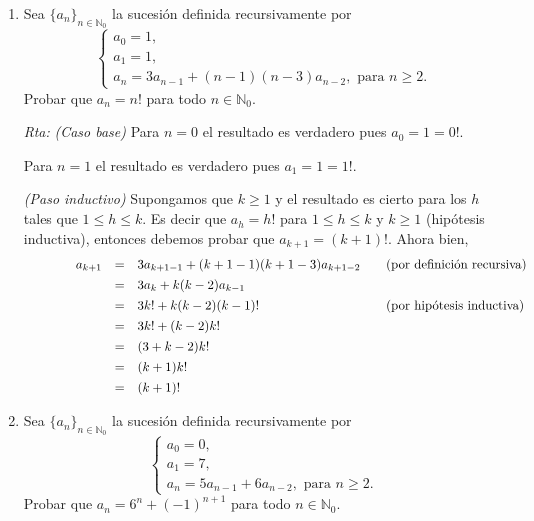 \documentclass[a4paper,12pt,twoside,spanish,reqno]{amsbook}
\numberwithin{equation}{section}
\newcommand{\rta}{\noindent\textit{Rta: }}
\begin{document}
\begin{enumerate}
        
        \item  Sea $\{a_n\}_{n\in\mathbb N_0}$ la sucesión definida recursivamente por
        $$\begin{cases}
        a_0=1, \\a_1=1, \\a_{n} = 3a_{n-1}+(n-1)(n-3)a_{n-2}, \text{ para $n\geq 2$}.
        \end{cases}$$
        Probar que $a_n=n!$ para todo $n\in \mathbb N_0$.

        \rta \textit{(Caso  base) } Para $n=0$ el resultado es verdadero pues $a_0 = 1 = 0!$.
        
        Para $n=1$ el resultado es verdadero pues $a_1 = 1 = 1!$.
        
        {\it (Paso  inductivo) } Supongamos que $k \ge 1$ y el resultado  es cierto para los $h$ tales que  $1 \le h \le k$. Es decir que $a_h = h!$ para $1 \le h \le k$ y $k \ge 1$ (hipótesis inductiva), entonces debemos probar que $a_{k+1} = (k+1)!$. Ahora bien, 
        \begin{equation*}
        \begin{matrix}\qquad\qquad
        a_{k+1} &=&  3a_{k+1-1}+(k+1-1)(k+1-3)a_{k+1-2}  \hfill &\quad \text{(por definición recursiva)} \hfill \\[4pt]
        &=&  3a_{k}+k(k-2)a_{k-1}   \hfill &\hfill\\[4pt]
        &=&  3k!+k(k-2)(k-1)!  \hfill &\quad \text{(por hipótesis inductiva})\hfill \\[4pt]
        &=&  3k!+(k-2)k! \hfill  & \hfill\\[4pt]
        &=&  (3 + k-2)k! \hfill  & \hfill\\[4pt]
        &=&  ( k+1)k! \hfill  & \hfill\\[4pt]
        &=&  (k+1)! \hfill  & \hfill\\
        \end{matrix}
        \end{equation*}

        \item Sea $\{a_n\}_{n\in\mathbb N_0}$ la sucesión definida recursivamente por
        $$\begin{cases}
        a_0=0, \\a_1=7, \\a_{n} = 5a_{n-1}+6a_{n-2}, \text{ para $n\geq 2$}.
        \end{cases}$$
        Probar que $a_n=6^n + (-1)^{n+1}$ para todo $n\in \mathbb N_0$.


\end{enumerate}
\end{document}
